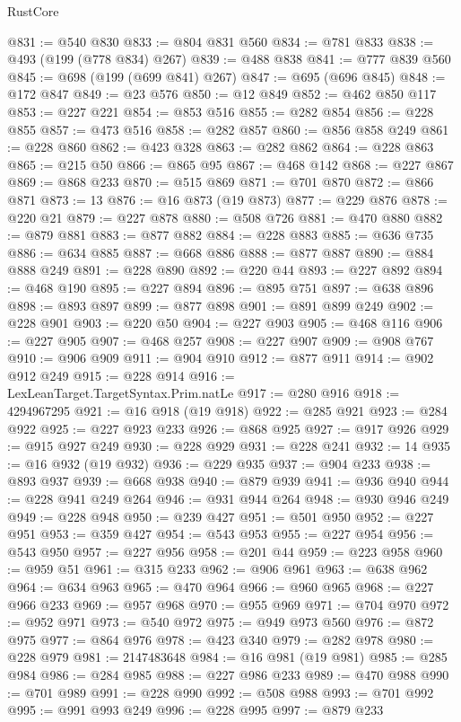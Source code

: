 \begin{lexlean}{RustCore}
\begin{coremodule}
@831 := @540 @830
@833 := @804 @831 @560
@834 := @781 @833
@838 := @493 (@199 (@778 @834) @267)
@839 := @488 @838
@841 := @777 @839 @560
@845 := @698 (@199 (@699 @841) @267)
@847 := @695 (@696 @845)
@848 := @172 @847
@849 := @23 @576
@850 := @12 @849
@852 := @462 @850 @117
@853 := @227 @221
@854 := @853 @516
@855 := @282 @854
@856 := @228 @855
@857 := @473 @516
@858 := @282 @857
@860 := @856 @858 @249
@861 := @228 @860
@862 := @423 @328
@863 := @282 @862
@864 := @228 @863
@865 := @215 @50
@866 := @865 @95
@867 := @468 @142
@868 := @227 @867
@869 := @868 @233
@870 := @515 @869
@871 := @701 @870
@872 := @866 @871
@873 := 13
@876 := @16 @873 (@19 @873)
@877 := @229 @876
@878 := @220 @21
@879 := @227 @878
@880 := @508 @726
@881 := @470 @880
@882 := @879 @881
@883 := @877 @882
@884 := @228 @883
@885 := @636 @735
@886 := @634 @885
@887 := @668 @886
@888 := @877 @887
@890 := @884 @888 @249
@891 := @228 @890
@892 := @220 @44
@893 := @227 @892
@894 := @468 @190
@895 := @227 @894
@896 := @895 @751
@897 := @638 @896
@898 := @893 @897
@899 := @877 @898
@901 := @891 @899 @249
@902 := @228 @901
@903 := @220 @50
@904 := @227 @903
@905 := @468 @116
@906 := @227 @905
@907 := @468 @257
@908 := @227 @907
@909 := @908 @767
@910 := @906 @909
@911 := @904 @910
@912 := @877 @911
@914 := @902 @912 @249
@915 := @228 @914
@916 := LexLeanTarget.TargetSyntax.Prim.natLe
@917 := @280 @916
@918 := 4294967295
@921 := @16 @918 (@19 @918)
@922 := @285 @921
@923 := @284 @922
@925 := @227 @923 @233
@926 := @868 @925
@927 := @917 @926
@929 := @915 @927 @249
@930 := @228 @929
@931 := @228 @241
@932 := 14
@935 := @16 @932 (@19 @932)
@936 := @229 @935
@937 := @904 @233
@938 := @893 @937
@939 := @668 @938
@940 := @879 @939
@941 := @936 @940
@944 := @228 @941 @249 @264
@946 := @931 @944 @264
@948 := @930 @946 @249
@949 := @228 @948
@950 := @239 @427
@951 := @501 @950
@952 := @227 @951
@953 := @359 @427
@954 := @543 @953
@955 := @227 @954
@956 := @543 @950
@957 := @227 @956
@958 := @201 @44
@959 := @223 @958
@960 := @959 @51
@961 := @315 @233
@962 := @906 @961
@963 := @638 @962
@964 := @634 @963
@965 := @470 @964
@966 := @960 @965
@968 := @227 @966 @233
@969 := @957 @968
@970 := @955 @969
@971 := @704 @970
@972 := @952 @971
@973 := @540 @972
@975 := @949 @973 @560
@976 := @872 @975
@977 := @864 @976
@978 := @423 @340
@979 := @282 @978
@980 := @228 @979
@981 := 2147483648
@984 := @16 @981 (@19 @981)
@985 := @285 @984
@986 := @284 @985
@988 := @227 @986 @233
@989 := @470 @988
@990 := @701 @989
@991 := @228 @990
@992 := @508 @988
@993 := @701 @992
@995 := @991 @993 @249
@996 := @228 @995
@997 := @879 @233

\end{coremodule}
\end{lexlean}
